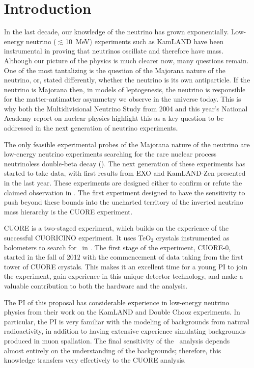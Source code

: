 

\section{Introduction}
In the last decade, our knowledge of the neutrino has grown exponentially. Low-energy neutrino ($\lesssim$10~MeV) experiments such as KamLAND have been instrumental in proving that neutrinos oscillate and therefore have mass. Although our picture of the physics is much clearer now, many questions remain. One of the most tantalizing is the question of the Majorana nature of the neutrino, or, stated differently, whether the neutrino is its own antiparticle. If the neutrino is Majorana then, in models of leptogenesis, the neutrino is responsible for the matter-antimatter  asymmetry we observe in the universe today. This is why both the Multidivisional Neutrino Study from 2004\cite{numatrix}  and this year's National Academy report on nuclear physics\cite{national2012Nuclear} highlight this as a key question to be addressed in the next generation of neutrino experiments.

The only feasible experimental probes of the Majorana nature of the neutrino are low-energy neutrino experiments searching for the rare nuclear process neutrinoless double-beta decay (\zeronu). The next generation of these experiments has started to take data, with first results from EXO\cite{EXO2012} and KamLAND-Zen\cite{KZ2nu} presented in the last year. These experiments are designed either to confirm or refute the claimed observation in \isoge\cite{KKK2006}. The first experiment designed to have the sensitivity to push beyond these bounds into the uncharted territory of the inverted neutrino mass hierarchy is the CUORE experiment. 

CUORE is a two-staged experiment, which builds on the experience of the successful CUORICINO experiment\cite{CC2008}. It uses TeO$_{2}$ crystals instrumented as bolometers to search for \zeronu~in \isomain. The first stage of the experiment, CUORE-0, started in the fall of 2012 with the commencement of data taking from the first tower of CUORE crystals. This makes it an excellent time for a young PI to join the experiment, gain experience in this unique detector technology, and make a valuable contribution to both the hardware and the analysis.

The PI of this proposal has considerable experience in low-energy neutrino physics from their work on the KamLAND and Double Chooz experiments. In particular, the PI is very familiar with the modeling of backgrounds from natural radioactivity, in addition to having extensive experience simulating backgrounds produced in muon spallation. The final sensitivity of the \zeronu~analysis depends almost entirely on the understanding of the backgrounds; therefore, this knowledge transfers very effectively to the CUORE analysis.

